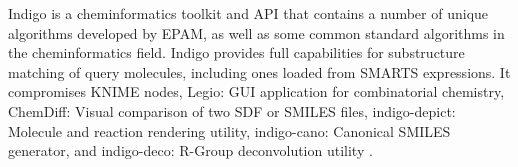 Indigo is a cheminformatics toolkit and API that contains a number of unique algorithms developed by EPAM, as well as some common standard algorithms in the cheminformatics field. Indigo provides full capabilities for substructure matching of query molecules, including ones loaded from SMARTS expressions. It compromises KNIME nodes, Legio: GUI application for combinatorial chemistry, ChemDiff: Visual comparison of two SDF or SMILES files, indigo-depict: Molecule and reaction rendering utility, indigo-cano: Canonical SMILES generator, and indigo-deco: R-Group deconvolution utility \cite{Pavlov_2011}.